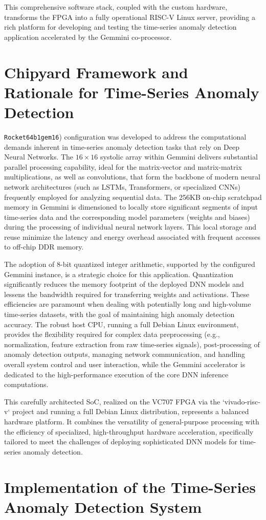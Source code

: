 This comprehensive software stack, coupled with the custom hardware, transforms the FPGA into a fully operational RISC-V Linux server, providing a rich platform for developing and testing the time-series anomaly detection application accelerated by the Gemmini co-processor.

\section{Chipyard Framework and Rationale for Time-Series Anomaly Detection}
\label{sec:framework_rationale_timeseries}

\texttt{Rocket64b1gem16}) configuration was developed to address the computational demands inherent in time-series anomaly detection tasks that rely on Deep Neural Networks. The $16 \times 16$ systolic array within Gemmini delivers substantial parallel processing capability, ideal for the matrix-vector and matrix-matrix multiplications, as well as convolutions, that form the backbone of modern neural network architectures (such as LSTMs, Transformers, or specialized CNNs) frequently employed for analyzing sequential data. The 256KB on-chip scratchpad memory in Gemmini is dimensioned to locally store significant segments of input time-series data and the corresponding model parameters (weights and biases) during the processing of individual neural network layers. This local storage and reuse minimize the latency and energy overhead associated with frequent accesses to off-chip DDR memory.

The adoption of 8-bit quantized integer arithmetic, supported by the configured Gemmini instance, is a strategic choice for this application. Quantization significantly reduces the memory footprint of the deployed DNN models and lessens the bandwidth required for transferring weights and activations. These efficiencies are paramount when dealing with potentially long and high-volume time-series datasets, with the goal of maintaining high anomaly detection accuracy. The robust host CPU, running a full Debian Linux environment, provides the flexibility required for complex data preprocessing (e.g., normalization, feature extraction from raw time-series signals), post-processing of anomaly detection outputs, managing network communication, and handling overall system control and user interaction, while the Gemmini accelerator is dedicated to the high-performance execution of the core DNN inference computations.

This carefully architected SoC, realized on the VC707 FPGA via the `vivado-risc-v` project and running a full Debian Linux distribution, represents a balanced hardware platform. It combines the versatility of general-purpose processing with the efficiency of specialized, high-throughput hardware acceleration, specifically tailored to meet the challenges of deploying sophisticated DNN models for time-series anomaly detection.



\section{Implementation of the Time-Series Anomaly Detection System}
\label{sec:implementation_of_the_time_series_anomaly_detection_system}


